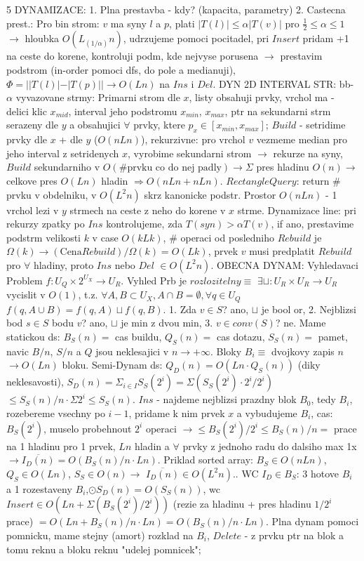 \documentclass[8pt]{extarticle}
\begin{document}
\begin{multicols*}{5}
DYNAMIZACE: 1. Plna prestavba - kdy? (kapacita, parametry) 2. Castecna prest.: Pro bin strom: $v$ ma syny $l$ a $p$, plati $|T(l)| \leq \alpha|T(v)|$ pro $\frac{1}{2}\leq\alpha\leq1$ $\rightarrow$ hloubka $O(L_{(1/\alpha)}n)$, udrzujeme pomoci pocitadel, pri $Insert$ pridam +1 na ceste do korene, kontroluji podm, kde nejvyse porusena $\rightarrow$ prestavim podstrom (in-order pomoci dfs, do pole a medianuji), $\Phi = ||T(l)| - |T(p)|| \rightarrow O(Ln)$ na $Ins$ i $Del$. DYN 2D INTERVAL STR: bb-$\alpha$ vyvazovane strmy: Primarni strom dle $x$, listy obsahuji prvky, vrchol ma - delici klic $x_{mid}$, interval jeho podstromu $x_{min}$, $x_{max}$, ptr na sekundarni strm serazeny dle $y$ a obsahujici $\forall$ prvky, ktere $p_x \in[x_{min}, x_{max}]$; $Build$ - setridime prvky dle $x$ + dle $y$ ($O(nLn)$), rekurzivne: pro vrchol $v$ vezmeme median pro jeho interval z setridenych $x$, vyrobime sekundarni strom $\rightarrow$ rekurze na syny, $Build$ sekundarniho v $O(\#\text{prvku co do nej padly}) \rightarrow \Sigma$ pres hladinu $O(n) \rightarrow$ celkove pres $O(Ln)$ hladin $\Rightarrow O(nLn + nLn)$. $RectangleQuery$: return \# prvku v obdelniku, v $O(L^2n)$ skrz kanonicke podstr. Prostor $O(nLn)$ - 1 vrchol lezi v $y$ strmech na ceste z neho do korene v $x$ strme. Dynamizace line: pri rekurzy zpatky po $Ins$ kontrolujeme, zda $T(syn) >\alpha T(v)$, if ano, prestavime podstrm velikosti $k$ v case $O(kLk)$, $\#$ operaci od posledniho $Rebuild$ je $\Omega(k) \rightarrow (\text{Cena} Rebuild)/\Omega(k) = O(Lk)$, prvek $v$ musi predplatit $Rebuild$ pro $\forall$ hladiny, proto $Ins$ nebo $Del$ $\in O(L^2n)$. OBECNA DYNAM: Vyhledavaci Problem $f: U_Q \times 2^{U_X} \rightarrow U_R$. Vyhled Prb je $rozlozitelny \equiv$ $\exists \sqcup: U_R \times U_R \rightarrow U_R$ vycislit v $O(1)$, t.z. $\forall A,B \subset U_X, A\cap B = \emptyset, \forall q \in U_Q$ $f(q, A\cup B) = f(q, A) \sqcup f(q, B)$. 1. Zda $v\in S$? ano, $\sqcup$ je bool or, 2. Nejblizsi bod $s\in S$ bodu $v$? ano, $\sqcup$ je min z dvou min, 3. $v\in conv(S)$? ne. Mame statickou ds: $B_S(n)=$ cas buildu, $Q_S(n)=$ cas dotazu, $S_S(n)=$ pamet, navic $B/n$, $S/n$ a $Q$ jsou neklesajici v $n\rightarrow +\infty$. Bloky $B_i \equiv$ dvojkovy zapis $n$ $\rightarrow O(Ln)$ bloku. Semi-Dynam ds: $Q_D(n) = O(Ln\cdot Q_S(n))$ (diky neklesavosti), $S_D(n) = \Sigma_{i\in I}S_S(2^i) = \Sigma(S_S(2^i)\cdot2^i/2^i)$ $\leq S_S(n)/n \cdot \Sigma2^i \leq S_S(n)$. $Ins$ - najdeme nejblizsi prazdny blok $B_0$, tedy $B_i$, rozebereme vsechny po $i-1$, pridame k nim prvek $x$ a vybudujeme $B_i$, cas:$B_S(2^i)$, muselo probehnout $2^i$ operaci $\rightarrow \leq B_S(2^i)/2^i \leq B_S(n)/n =$ prace na 1 hladinu pro 1 prvek, $Ln$ hladin a $\forall$ prvky z jednoho radu do dalsiho max 1x $\rightarrow \overline{I_D(n)}=O(B_S(n)/n \cdot Ln)$. Priklad sorted array: $B_S\in O(nLn)$, $Q_S\in O(Ln)$, $S_S \in O(n) \rightarrow$ $\overline{I_D(n)}\in O(L^2n)$.. WC $I_D \in B_S$: 3 hotove $B_i$ a 1 rozestaveny $B_i$,$\odot S_D(n) = O(S_S(n))$, wc $Insert \in O(Ln + \Sigma (B_S(2^i)/2^i))$ (rezie za hladinu + pres hladinu $1/2^i$ prace) $= O(Ln + B_S(n)/n \cdot Ln) = O(B_S(n)/n \cdot Ln)$. Plna dynam pomoci pomnicku, mame stejny (amort) rozklad na $B_i$, $Delete$ - z prvku ptr na blok a tomu reknu a bloku reknu "udelej pomnicek"; 
\end{multicols*}
\end{document}
